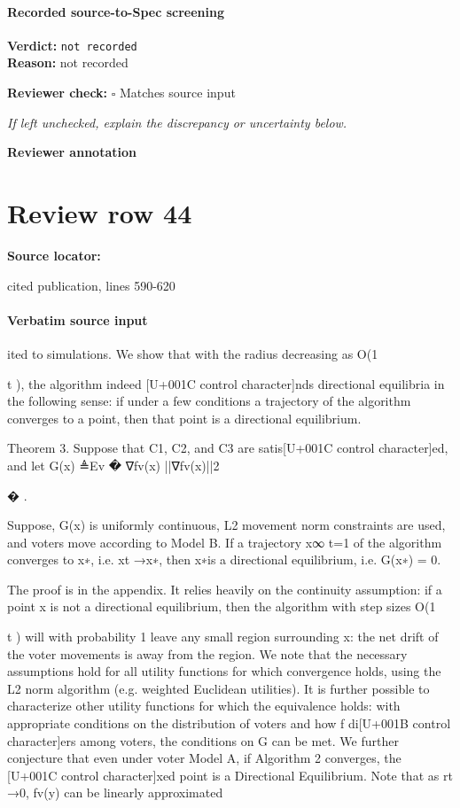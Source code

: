 \documentclass[10pt]{article}
\newcommand{\reviewerbox}{%
  \par\noindent\fbox{\parbox{0.96\linewidth}{\rule{0pt}{0.38in}}}\par
}
\newcommand{\reviewmatch}[1]{%
  \par\noindent\textbf{Reviewer check:} $\square$\; #1\par
  \noindent\emph{If left unchecked, explain the discrepancy or uncertainty below.}\par
}
\begin{document}
\paragraph{Recorded source-to-Spec screening}
\textbf{Verdict:} \texttt{not recorded}
\\
\textbf{Reason:} not recorded
\reviewmatch{Matches source input}
\noindent\textbf{Reviewer annotation}\par
\reviewerbox
\clearpage
\hypertarget{source-claim-970bf26e54daa2aa}{}
\section*{Review row 44}
\textbf{Source locator:} {\footnotesize\raggedright cited publication, lines 590-\allowbreak{}620\par}
\paragraph{Verbatim source input}
\begin{ReviewVerbatim}
ited to simulations. We show that with the radius decreasing as O(1

t ), the algorithm indeed
[U+001C control character]nds directional equilibria in the following sense: if under a few conditions a trajectory of
the algorithm converges to a point, then that point is a directional equilibrium.

Theorem 3. Suppose that C1, C2, and C3 are satis[U+001C control character]ed, and let G(x) ≜Ev
�
∇fv(x)
||∇fv(x)||2

�
.

Suppose, G(x) is uniformly continuous, L2 movement norm constraints are used, and voters
move according to Model B. If a trajectory {x}∞
t=1 of the algorithm converges to x∗, i.e.
xt →x∗, then x∗is a directional equilibrium, i.e. G(x∗) = 0.

The proof is in the appendix. It relies heavily on the continuity assumption: if a point x
is not a directional equilibrium, then the algorithm with step sizes O(1

t ) will with probability
1 leave any small region surrounding x: the net drift of the voter movements is away from
the region. We note that the necessary assumptions hold for all utility functions for which
convergence holds, using the L2 norm algorithm (e.g. weighted Euclidean utilities). It is
further possible to characterize other utility functions for which the equivalence holds: with
appropriate conditions on the distribution of voters and how f di[U+001B control character]ers among voters, the
conditions on G can be met.
We further conjecture that even under voter Model A, if Algorithm 2 converges, the [U+001C control character]xed
point is a Directional Equilibrium. Note that as rt →0, fv(y) can be linearly approximated
\end{ReviewVerbatim}
\end{document}
